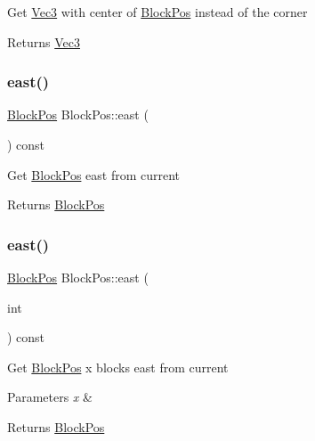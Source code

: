 Get \mbox{\hyperlink{struct_vec3}{Vec3}} with center of \mbox{\hyperlink{struct_block_pos}{Block\+Pos}} instead of the corner \begin{DoxyReturn}{Returns}
\mbox{\hyperlink{struct_vec3}{Vec3}} 
\end{DoxyReturn}
\mbox{\label{struct_block_pos_a3631ed52d6914b3ae30dfaaa22d0eca1}} 
\subsubsection{\texorpdfstring{east()}{east()}\hspace{0.1cm}{\footnotesize\ttfamily [1/2]}}
{\footnotesize\ttfamily \mbox{\hyperlink{struct_block_pos}{Block\+Pos}} Block\+Pos\+::east (\begin{DoxyParamCaption}{ }\end{DoxyParamCaption}) const}

Get \mbox{\hyperlink{struct_block_pos}{Block\+Pos}} east from current \begin{DoxyReturn}{Returns}
\mbox{\hyperlink{struct_block_pos}{Block\+Pos}} 
\end{DoxyReturn}
\mbox{\label{struct_block_pos_ae9be8e210eee9303c27ed8a074f34da2}} 
\subsubsection{\texorpdfstring{east()}{east()}\hspace{0.1cm}{\footnotesize\ttfamily [2/2]}}
{\footnotesize\ttfamily \mbox{\hyperlink{struct_block_pos}{Block\+Pos}} Block\+Pos\+::east (\begin{DoxyParamCaption}\item[{int}]{ }\end{DoxyParamCaption}) const}

Get \mbox{\hyperlink{struct_block_pos}{Block\+Pos}} x blocks east from current 
\begin{DoxyParams}{Parameters}
{\em x} & \\
\hline
\end{DoxyParams}
\begin{DoxyReturn}{Returns}
\mbox{\hyperlink{struct_block_pos}{Block\+Pos}} 
\end{DoxyReturn}
\mbox{\label{struct_block_pos_acb22f0caa009bb49e768f34622fe5a15}} 
